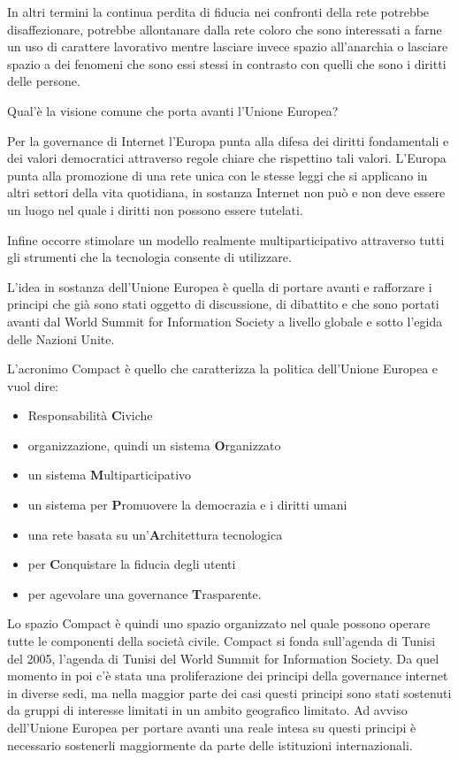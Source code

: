 In altri termini la continua perdita di fiducia nei confronti della rete potrebbe disaffezionare, potrebbe allontanare dalla rete coloro che sono interessati a farne un uso di carattere lavorativo mentre lasciare invece spazio all'anarchia o lasciare spazio a dei fenomeni che sono essi stessi in contrasto con quelli che sono i diritti delle persone.

Qual'è la visione comune che porta avanti l'Unione Europea? 

Per la governance di Internet l'Europa punta alla difesa dei diritti fondamentali e dei valori democratici attraverso regole chiare che rispettino tali valori. L'Europa punta alla promozione di una rete unica con le stesse leggi che si applicano in altri settori della vita quotidiana, in sostanza Internet non può e non deve essere un luogo nel quale i diritti non possono essere tutelati.

Infine occorre stimolare un modello realmente multiparticipativo attraverso tutti gli strumenti che la tecnologia consente di utilizzare.

L'idea in sostanza dell'Unione Europea è quella di portare avanti e rafforzare i principi che già sono stati oggetto di discussione, di dibattito e che sono portati avanti dal World Summit for Information Society a livello globale e sotto l'egida delle Nazioni Unite. 

L'acronimo Compact è quello che caratterizza la politica dell'Unione Europea e vuol dire:
\begin{itemize}
    \item Responsabilità \textbf{C}iviche
    \item organizzazione, quindi un sistema \textbf{O}rganizzato
    \item un sistema \textbf{M}ultiparticipativo
    \item un sistema per \textbf{P}romuovere la democrazia e i diritti umani
    \item una rete basata su un'\textbf{A}rchitettura tecnologica
    \item per \textbf{C}onquistare la fiducia degli utenti
    \item per agevolare una governance \textbf{T}rasparente.
\end{itemize}
\par
Lo spazio Compact è quindi uno spazio organizzato nel quale possono operare tutte le componenti della società civile. Compact si fonda sull'agenda di Tunisi del 2005, l'agenda di Tunisi del World Summit for Information Society. Da quel momento in poi c'è stata una proliferazione dei principi della governance internet in diverse sedi, ma nella maggior parte dei casi questi principi sono stati sostenuti da gruppi di interesse limitati in un ambito geografico limitato. Ad avviso dell'Unione Europea per portare avanti una reale intesa su questi principi è necessario sostenerli maggiormente da parte delle istituzioni internazionali. 


